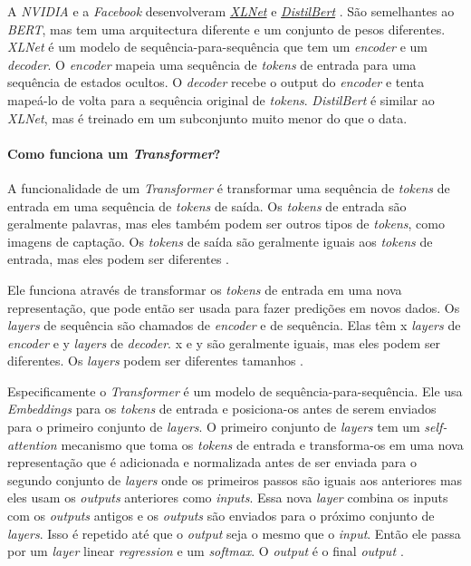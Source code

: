 A \textit{NVIDIA} e a \textit{Facebook} desenvolveram \href{https://arxiv.org/abs/1906.08237}{\textit{XLNet}} e \href{https://arxiv.org/abs/1810.04805}{\textit{DistilBert}} \cite{yt2}. São semelhantes ao \textit{BERT}, mas tem uma arquitectura diferente e um conjunto de pesos diferentes. \textit{XLNet} é um modelo de sequência-para-sequência que tem um \textit{encoder} e um \textit{decoder}. O \textit{encoder} mapeia uma sequência de \textit{tokens} de entrada para uma sequência de estados ocultos. O \textit{decoder} recebe o output do \textit{encoder} e tenta mapeá-lo de volta para a sequência original de \textit{tokens}. \textit{DistilBert} é similar ao \textit{XLNet}, mas é treinado em um subconjunto muito menor do que o data.

\paragraph{Como funciona um \textit{Transformer}?\\}

A funcionalidade de um \textit{Transformer} é transformar uma sequência de \textit{tokens} de entrada em uma sequência de \textit{tokens} de saída. Os \textit{tokens} \cite{mtf1} \cite{mtf2} de entrada são geralmente palavras, mas eles também podem ser outros tipos de \textit{tokens}, como imagens de captação. Os \textit{tokens} de saída são geralmente iguais aos \textit{tokens} de entrada, mas eles podem ser diferentes \cite{hf1}.

Ele funciona através de transformar os \textit{tokens} de entrada em uma nova representação, que pode então ser usada para fazer predições em novos dados. Os \textit{layers} de sequência são chamados de \textit{encoder} \cite{mtf1} e de sequência. Elas têm x \textit{layers} de \textit{encoder} e y \textit{layers} de \textit{decoder}. x e y são geralmente iguais, mas eles podem ser diferentes. Os \textit{layers} podem ser diferentes tamanhos \cite{hf1}.

Especificamente o \textit{Transformer} é um modelo de sequência-para-sequência. Ele usa \textit{Embeddings} para os \textit{tokens} de entrada e posiciona-os antes de serem enviados para o primeiro conjunto de \textit{layers}. O primeiro conjunto de \textit{layers} tem um \textit{self-attention} \cite{mtf2} mecanismo que toma os \textit{tokens} \cite{mtf1} de entrada e transforma-os em uma nova representação que é adicionada e normalizada antes de ser enviada para o segundo conjunto de \textit{layers} onde os primeiros passos são iguais aos anteriores mas eles usam os \textit{outputs} anteriores como \textit{inputs}. Essa nova \textit{layer} combina os inputs com os \textit{outputs} antigos e os \textit{outputs} são enviados para o próximo conjunto de \textit{layers}. Isso é repetido até que o \textit{output} seja o mesmo que o \textit{input}. Então ele passa por um \textit{layer} linear \textit{regression} e um \textit{softmax}. O \textit{output} é o final \textit{output \cite{hf1}}.

